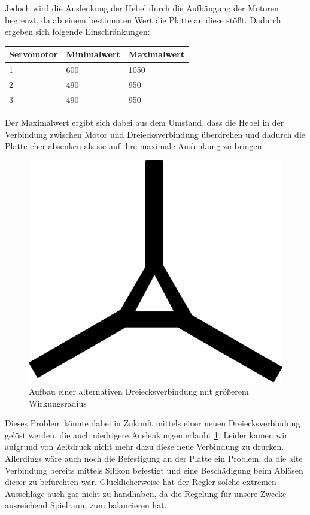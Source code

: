 \documentclass[12pt,a4paper,bibliography=totoc,listof=totoc]{scrartcl}
\begin{document}
Jedoch wird die Auslenkung der Hebel durch die Aufhängung der Motoren begrenzt, da ab einem 
bestimmten Wert die Platte an diese stößt. Dadurch ergeben sich folgende Einschränkungen:
\newline
\begin{tabularx}{8cm}{|l|l|l|}
\hline
 Servomotor		& Minimalwert & Maximalwert \\
\hline
 1				& 600		&  1050 \\
\hline
 2				& 490		& 950\\
\hline
 3				& 490		& 950\\
\hline
\end{tabularx}
\newline
Der Maximalwert ergibt sich dabei aus dem Umstand, dass die Hebel in der Verbindung zwischen Motor und 
Dreiecksverbindung überdrehen und dadurch die Platte eher absenken als sie auf ihre maximale Auslenkung zu 
bringen. 
 \begin{figure}[htbp]
	\centering
	\includegraphics[scale = 0.8]{pics/neuedreiecksverbindung}
	\caption{Aufbau einer alternativen Dreiecksverbindung mit größerem Wirkungsradius}
	\label{fig:dreieckneu}
\end{figure}
Dieses Problem könnte dabei in Zukunft mittels einer neuen Dreiecksverbindung gelöst werden, die auch niedrigere 
Auslenkungen erlaubt \ref {fig:dreieckneu}. Leider kamen wir aufgrund von Zeitdruck nicht mehr dazu diese neue Verbindung zu drucken. 
Allerdings wäre auch noch die Befestigung an der Platte ein Problem, da die alte Verbindung bereits mittels Silikon befestigt und 
eine Beschädigung beim Ablösen dieser zu befürchten war. Glücklicherweise hat der Regler solche extremen Ausschläge auch gar nicht zu 
handhaben, da die Regelung für unsere Zwecke ausreichend Spielraum zum balancieren hat.
\end{document}
